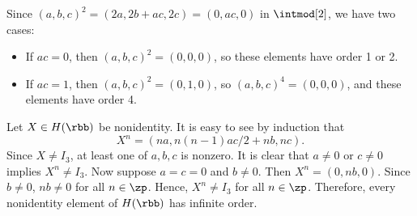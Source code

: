 \begin{solenum}
\[    \]
    Since $(a, b, c)^2 = (2a, 2b + ac, 2c) = (0, ac, 0)$ in $\intmod[2]$, we have two cases:
    \begin{itemize}
        \item If $ac = 0$, then $(a, b, c)^2 = (0, 0, 0)$, so these elements have order 1 or 2.
        \item If $ac = 1$, then $(a, b, c)^2 = (0, 1, 0)$, so $(a, b, c)^4 = (0, 0, 0)$, and these elements have order 4.
    \end{itemize}
    \item Let $X \in H(\rbb)$ be nonidentity.
	It is easy to see by induction that
    \[
    	X^n = (na, n(n - 1)ac/2 + nb, nc).
    \]
    Since $X \neq I_3$, at least one of $a, b, c$ is nonzero.
	It is clear that $a \neq 0$ or $c \neq 0$ implies $X^n \neq I_3$.
	Now suppose $a = c = 0$ and $b \neq 0$.
	Then $X^n = (0, nb, 0)$.
	Since $b \neq 0$, $nb \neq 0$ for all $n \in \zp$.
	Hence, $X^n \neq I_3$ for all $n \in \zp$.
	Therefore, every nonidentity element of $H(\rbb)$ has infinite order.
\end{solenum}